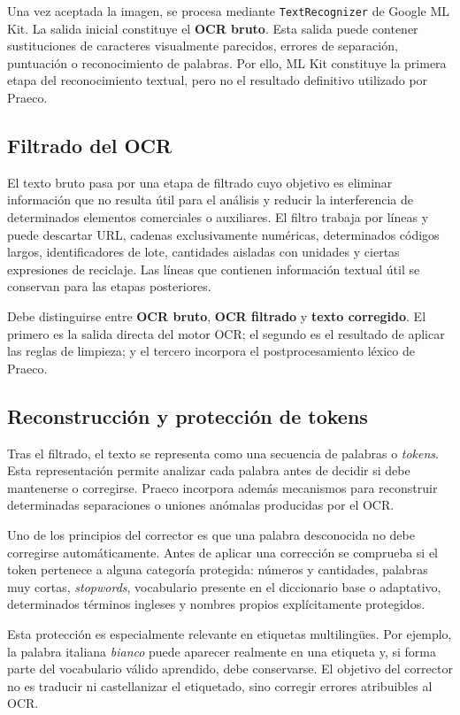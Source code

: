 Una vez aceptada la imagen, se procesa mediante \texttt{TextRecognizer} de Google ML Kit. La salida inicial constituye el \textbf{OCR bruto}. Esta salida puede contener sustituciones de caracteres visualmente parecidos, errores de separación, puntuación o reconocimiento de palabras. Por ello, ML Kit constituye la primera etapa del reconocimiento textual, pero no el resultado definitivo utilizado por Praeco.

\subsection{Filtrado del OCR}

El texto bruto pasa por una etapa de filtrado cuyo objetivo es eliminar información que no resulta útil para el análisis y reducir la interferencia de determinados elementos comerciales o auxiliares. El filtro trabaja por líneas y puede descartar URL, cadenas exclusivamente numéricas, determinados códigos largos, identificadores de lote, cantidades aisladas con unidades y ciertas expresiones de reciclaje. Las líneas que contienen información textual útil se conservan para las etapas posteriores.

Debe distinguirse entre \textbf{OCR bruto}, \textbf{OCR filtrado} y \textbf{texto corregido}. El primero es la salida directa del motor OCR; el segundo es el resultado de aplicar las reglas de limpieza; y el tercero incorpora el postprocesamiento léxico de Praeco.

\subsection{Reconstrucción y protección de tokens}

Tras el filtrado, el texto se representa como una secuencia de palabras o \textit{tokens}. Esta representación permite analizar cada palabra antes de decidir si debe mantenerse o corregirse. Praeco incorpora además mecanismos para reconstruir determinadas separaciones o uniones anómalas producidas por el OCR.

Uno de los principios del corrector es que una palabra desconocida no debe corregirse automáticamente. Antes de aplicar una corrección se comprueba si el token pertenece a alguna categoría protegida: números y cantidades, palabras muy cortas, \textit{stopwords}, vocabulario presente en el diccionario base o adaptativo, determinados términos ingleses y nombres propios explícitamente protegidos.

Esta protección es especialmente relevante en etiquetas multilingües. Por ejemplo, la palabra italiana \textit{bianco} puede aparecer realmente en una etiqueta y, si forma parte del vocabulario válido aprendido, debe conservarse. El objetivo del corrector no es traducir ni castellanizar el etiquetado, sino corregir errores atribuibles al OCR.

